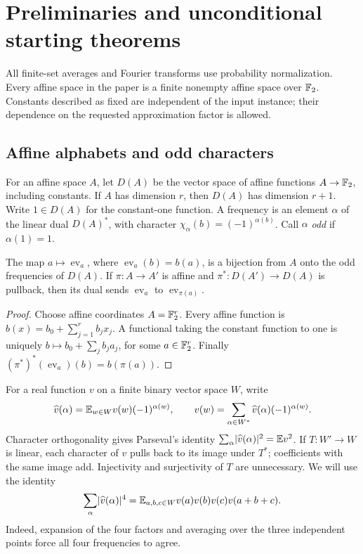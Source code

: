 \section{Preliminaries and unconditional starting theorems}
\label{sec:preliminaries}

All finite-set averages and Fourier transforms use probability normalization.
Every affine space in the paper is a finite nonempty affine space over $\mathbb F_2$.
Constants described as fixed are independent of the input instance; their
dependence on the requested approximation factor is allowed.

\subsection{Affine alphabets and odd characters}

For an affine space $A$, let $D(A)$ be the vector space of affine functions
$A\to\mathbb F_2$, including constants. If $A$ has dimension $r$, then $D(A)$ has
dimension $r+1$. Write $1\in D(A)$ for the constant-one function. A frequency
is an element $\alpha$ of the linear dual $D(A)^*$, with character
$\chi_\alpha(b)=(-1)^{\alpha(b)}$. Call $\alpha$ \emph{odd} if $\alpha(1)=1$.

\begin{lemma}\label{lem:odd-labels}
The map $a\mapsto\operatorname{ev}_a$, where
$\operatorname{ev}_a(b)=b(a)$, is a bijection from $A$ onto the odd frequencies
of $D(A)$. If $\pi:A\to A'$ is affine and
$\pi^*:D(A')\to D(A)$ is pullback, then its dual sends
$\operatorname{ev}_a$ to $\operatorname{ev}_{\pi(a)}$.
\end{lemma}
\begin{proof}
Choose affine coordinates $A=\mathbb F_2^r$. Every affine function is
$b(x)=b_0+\sum_{j=1}^r b_jx_j$. A functional taking the constant function to
one is uniquely $b\mapsto b_0+\sum_j b_ja_j$, for some $a\in\mathbb F_2^r$.
Finally $(\pi^*)^*(\operatorname{ev}_a)(b)=b(\pi(a))$.
\end{proof}

For a real function $v$ on a finite binary vector space $W$, write
\[
 \widehat v(\alpha)=\mathbb E_{w\in W}v(w)(-1)^{\alpha(w)},\qquad
 v(w)=\sum_{\alpha\in W^*}\widehat v(\alpha)(-1)^{\alpha(w)}.
\]
Character orthogonality gives Parseval's identity
$\sum_\alpha\lvert\widehat v(\alpha)\rvert^2=\mathbb E v^2$.
If $T:W'\to W$ is linear, each character of $v$ pulls back to its image
under $T^*$; coefficients with the same image add. Injectivity and
surjectivity of $T$ are unnecessary. We will use the identity
\begin{equation}\label{eq:fourth-moment}
 \sum_\alpha\lvert\widehat v(\alpha)\rvert^4
 =\mathbb E_{a,b,c\in W}v(a)v(b)v(c)v(a+b+c).
\end{equation}
Indeed, expansion of the four factors and averaging over the three independent
points force all four frequencies to agree.

